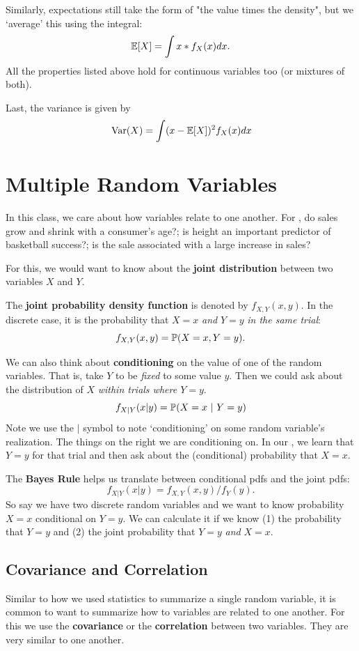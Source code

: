 \documentclass[12pt]{article}
\begin{document}
Similarly, expectations still take the form of "the value times the density", but we `average' this using the integral:
$$
  \E{X} = \int x * f_{X}(x) dx.
$$
All the properties listed above hold for continuous variables too (or mixtures of both).

Last, the variance is given by
$$
  \var{X} = \int (x - \expec{X})^2 f_{X}(x) dx
$$


\section{Multiple Random Variables}

In this class, we care about how variables relate to one another. For , do sales grow and shrink with a consumer's age?; is height an important predictor of basketball success?; is the sale associated with a large increase in sales?

For this, we would want to know about the \textbf{joint distribution} between two variables $X$ and $Y$.

The \textbf{joint probability density function} is denoted by $f_{X,Y}(x, y)$. In the discrete case, it is the probability that $X = x$ \emph{and} $Y = y$ \emph{in the same trial}:
$$
  f_{X,Y}(x, y) = \P{X = x, Y = y}.
$$

We can also think about \textbf{conditioning} on the value of one of the random variables. That is, take $Y$ to be \emph{fixed} to some value $y$. Then we could ask about the distribution of $X$ \emph{within trials where $Y = y$}.
$$
  f_{X \vert Y}(x \vert y) = \P{X = x}{Y = y}
$$
Note we use the $\vert$ symbol to note `conditioning' on some random variable's realization. The things on the right we are conditioning on. In our , we learn that $Y = y$ for that trial and then ask about the (conditional) probability that $X = x$.

The \textbf{Bayes Rule} helps us translate between conditional pdfs and the joint pdfs:
$$
  f_{X \vert Y}(x \vert y) = f_{X,Y}(x, y) / f_{Y}(y).
$$
So say we have two discrete random variables and we want to know probability $X = x$ conditional on $Y = y$. We can calculate it if we know (1) the probability that $Y = y$ and (2) the joint probability that $Y = y$ \emph{and} $X = x$.


\subsection*{Covariance and Correlation}

Similar to how we used statistics to summarize a single random variable, it is common to want to summarize how to variables are related to one another. For this we use the \textbf{covariance} or the \textbf{correlation} between two variables. They are very similar to one another.
\end{document}

